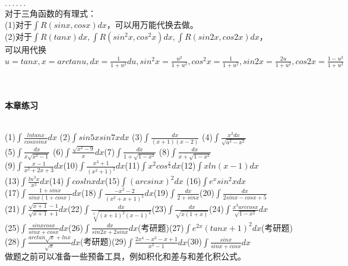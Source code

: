 \documentclass[UTF8]{ctexart}
\begin{document}
\\ $\cdot \cdot \cdot \cdot \cdot \cdot $
\\ 对于三角函数的有理式：
\\ (1)对于$\displaystyle{\int R(sinx,cosx)dx }$，可以用万能代换去做。
\\ (2)对于$\displaystyle{\int R(tanx)dx,\int R(sin^2x,cos^2x)dx,\int R(sin2x,cos2x)dx}$，\\ 可以用代换$\displaystyle{u=tanx,x=arctanu,dx=\frac{1}{1+u^2}du,sin^2x=\frac{u^2}{1+u^2},cos^2x=\frac{1}{1+u^2},sin2x=\frac{2u}{1+u^2},cos2x=\frac{1-u^2}{1+u^2}}$
\\ \\ \\ \centerline{\textbf{本章练习}}
\\(1)$\displaystyle{\int \frac{lntanx}{cosxsinx}dx}$ \quad\quad\quad (2)$\displaystyle{\int sin5xsin7xdx}$ \quad\quad\quad  (3)$\displaystyle{\int \frac{dx}{(x+1)(x-2)}}$ \quad \quad\quad (4)$\displaystyle{\int \frac{x^2dx}{\sqrt{a^2-x^2}}}$
\\ (5)$\displaystyle{\int \frac{dx}{x\sqrt{x^2-1}}}$ \quad\quad\quad (6)$\displaystyle{\int \frac{\sqrt{x^2-9}}{x}dx}$\quad\quad\quad (7)$\displaystyle{\int \frac{dx}{1+\sqrt{1-x^2}}}$ \quad\quad\quad (8)$\displaystyle{\int \frac{dx}{x+\sqrt{1-x^2}}}$
\\(9)$\displaystyle{\int \frac{x-1}{x^2+2x+3}dx}$\quad\quad\quad (10)$\displaystyle{\int \frac{x^3+1}{(x^2+1)^2}dx}$\quad\quad\quad (11)$\displaystyle{\int x^2cos^{\frac{x}{2}}dx}$\quad\quad\quad (12)$\displaystyle{\int xln(x-1)dx}$
\\(13)$\displaystyle{\int \frac{ln^3x}{x^2}dx}$\quad\quad\quad (14)$\displaystyle{\int coslnxdx}$\quad\quad\quad (15)$\displaystyle{\int (arcsinx)^2dx}$ \quad\quad\quad (16)$\displaystyle{\int e^xsin^2xdx}$
\\(17)$\displaystyle{\int \frac{1+sinx}{sinx(1+cosx)}dx}$\quad\quad\quad(18)$\displaystyle{\int \frac{-x^2-2}{(x^2+x+1)^2}dx}$\quad\quad\quad(19)$\displaystyle{\int \frac{dx}{2+sinx}}$\quad\quad\quad(20)$\displaystyle{\int \frac{dx}{2sinx-cosx+5}}$
\\(21)$\displaystyle{\int \frac{\sqrt{x+1}-1}{\sqrt{x+1}+1}dx}$\quad\quad\quad(22)$\displaystyle{\int \frac{dx}{\sqrt[3]{(x+1)^2(x-1)^4}}}$\quad\quad\quad(23)$\displaystyle{\int \frac{dx}{\sqrt{x(1+x)}}}$\quad\quad\quad(24)$\displaystyle{\int \frac{x^3arccosx}{\sqrt{1-x^2}}dx}$
\\(25)$\displaystyle{\int \frac{sinxcosx}{sinx+cosx}dx}$\quad\quad\quad(26)$\displaystyle{\int \frac{dx}{sin2x+2sinx}dx}$(考研题)\quad\quad\quad(27)$\displaystyle{\int e^{2x}(tanx+1)^2dx}$(考研题)
\\(28)$\displaystyle{\int \frac{arctan\sqrt{x}+lnx}{\sqrt{x}}dx}$(考研题)\quad\quad\quad(29)$\displaystyle{\int \frac{2x^4-x^3-x+1}{x^3-1}dx}$\quad\quad\quad(30)$\displaystyle{\int \frac{sinx}{sinx+cosx}dx}$
\\ 做题之前可以准备一些预备工具，例如积化和差与和差化积公式。
\end{document}
